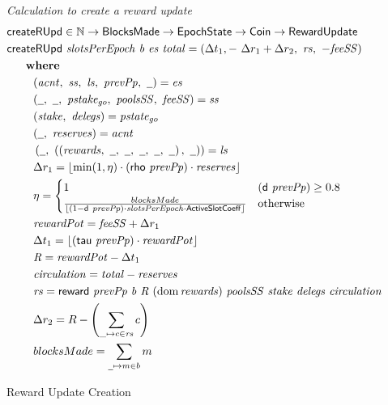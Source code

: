 \begin{figure}[htb]
  \emph{Calculation to create a reward update}
  \begin{align*}
    & \fun{createRUpd} \in \N \to \BlocksMade \to \EpochState \to \Coin \to \RewardUpdate \\
    & \createRUpd{slotsPerEpoch}{b}{es}{total} = \left(
      \Delta t_1,-~\Delta r_1+\Delta r_2,~\var{rs},~-\var{feeSS}\right) \\
    & ~~~\where \\
    & ~~~~~~~(\var{acnt},~\var{ss},~\var{ls},~\var{prevPp},~\wcard) = \var{es} \\
    & ~~~~~~~(\wcard,~\wcard,~\var{pstake_{go}},~\var{poolsSS},~\var{feeSS}) = \var{ss}\\
    & ~~~~~~~(\var{stake},~\var{delegs}) = \var{pstate_{go}} \\
    & ~~~~~~~(\wcard,~\var{reserves}) = \var{acnt} \\
    & ~~~~~~~\left(
      \wcard,~
      \left(
      \left(\var{rewards},~\wcard,~\wcard,~\wcard,~\wcard,~\wcard\right),~
      \wcard
      \right)
      \right) = \var{ls} \\
    & ~~~~~~~\Delta r_1 = \floor*{\min(1,\eta) \cdot (\fun{rho}~\var{prevPp}) \cdot
      \var{reserves}}
    \\
    & ~~~~~~~\eta =
      \begin{cases}
        1 & (\fun{d}~\var{prevPp})\geq 0.8 \\
        \frac{blocksMade}{\floor{(1-\fun{d}~\var{prevPp})\cdot\var{slotsPerEpoch} \cdot \ActiveSlotCoeff}}
          & \text{otherwise} \\
      \end{cases} \\
    & ~~~~~~~\var{rewardPot} = \var{feeSS} + \Delta r_1 \\
    & ~~~~~~~\Delta t_1 = \floor*{(\fun{tau}~\var{prevPp}) \cdot \var{rewardPot}} \\
    & ~~~~~~~\var{R} = \var{rewardPot} - \Delta t_1 \\
    & ~~~~~~~\var{circulation} = \var{total} - \var{reserves} \\
    & ~~~~~~~\var{rs}
      = \reward{prevPp}{b}{R}{(\dom{rewards})}{poolsSS}{stake}{delegs}{circulation} \\
    & ~~~~~~~\Delta r_{2} = R - \left(\sum\limits_{\_\mapsto c\in\var{rs}}c\right) \\
    & ~~~~~~~blocksMade = \sum_{\wcard \mapsto m \in b}m
  \end{align*}

  \caption{Reward Update Creation}
  \label{fig:functions:reward-update-creation}
\end{figure}

